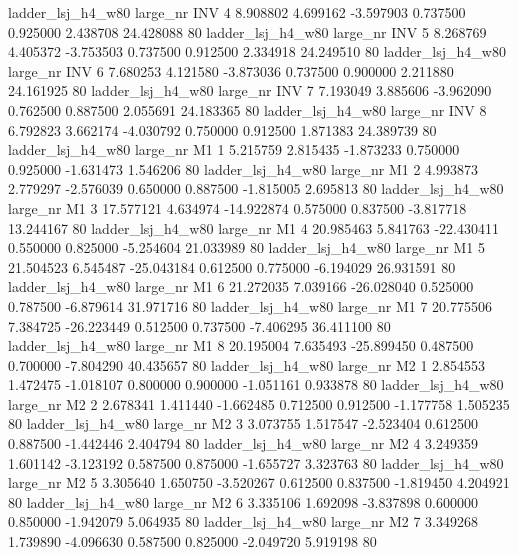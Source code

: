   ladder_lsj_h4_w80   large_nr      INV                 4  8.908802  4.699162  -3.597903 0.737500 0.925000  2.438708   24.428088 80
  ladder_lsj_h4_w80   large_nr      INV                 5  8.268769  4.405372  -3.753503 0.737500 0.912500  2.334918   24.249510 80
  ladder_lsj_h4_w80   large_nr      INV                 6  7.680253  4.121580  -3.873036 0.737500 0.900000  2.211880   24.161925 80
  ladder_lsj_h4_w80   large_nr      INV                 7  7.193049  3.885606  -3.962090 0.762500 0.887500  2.055691   24.183365 80
  ladder_lsj_h4_w80   large_nr      INV                 8  6.792823  3.662174  -4.030792 0.750000 0.912500  1.871383   24.389739 80
  ladder_lsj_h4_w80   large_nr       M1                 1  5.215759  2.815435  -1.873233 0.750000 0.925000 -1.631473    1.546206 80
  ladder_lsj_h4_w80   large_nr       M1                 2  4.993873  2.779297  -2.576039 0.650000 0.887500 -1.815005    2.695813 80
  ladder_lsj_h4_w80   large_nr       M1                 3 17.577121  4.634974 -14.922874 0.575000 0.837500 -3.817718   13.244167 80
  ladder_lsj_h4_w80   large_nr       M1                 4 20.985463  5.841763 -22.430411 0.550000 0.825000 -5.254604   21.033989 80
  ladder_lsj_h4_w80   large_nr       M1                 5 21.504523  6.545487 -25.043184 0.612500 0.775000 -6.194029   26.931591 80
  ladder_lsj_h4_w80   large_nr       M1                 6 21.272035  7.039166 -26.028040 0.525000 0.787500 -6.879614   31.971716 80
  ladder_lsj_h4_w80   large_nr       M1                 7 20.775506  7.384725 -26.223449 0.512500 0.737500 -7.406295   36.411100 80
  ladder_lsj_h4_w80   large_nr       M1                 8 20.195004  7.635493 -25.899450 0.487500 0.700000 -7.804290   40.435657 80
  ladder_lsj_h4_w80   large_nr       M2                 1  2.854553  1.472475  -1.018107 0.800000 0.900000 -1.051161    0.933878 80
  ladder_lsj_h4_w80   large_nr       M2                 2  2.678341  1.411440  -1.662485 0.712500 0.912500 -1.177758    1.505235 80
  ladder_lsj_h4_w80   large_nr       M2                 3  3.073755  1.517547  -2.523404 0.612500 0.887500 -1.442446    2.404794 80
  ladder_lsj_h4_w80   large_nr       M2                 4  3.249359  1.601142  -3.123192 0.587500 0.875000 -1.655727    3.323763 80
  ladder_lsj_h4_w80   large_nr       M2                 5  3.305640  1.650750  -3.520267 0.612500 0.837500 -1.819450    4.204921 80
  ladder_lsj_h4_w80   large_nr       M2                 6  3.335106  1.692098  -3.837898 0.600000 0.850000 -1.942079    5.064935 80
  ladder_lsj_h4_w80   large_nr       M2                 7  3.349268  1.739890  -4.096630 0.587500 0.825000 -2.049720    5.919198 80
